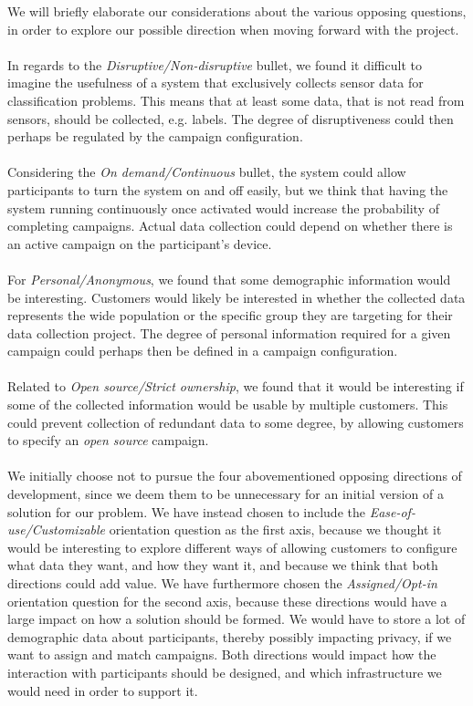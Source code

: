We will briefly elaborate our considerations about the various opposing questions, in order to explore our possible direction when moving forward with the project. 
\\\\
In regards to the \emph{Disruptive/Non-disruptive} bullet, we found it difficult to imagine the usefulness of a system that exclusively collects sensor data for classification problems. This means that at least some data, that is not read from sensors, should be collected, e.g. labels. The degree of disruptiveness could then perhaps be regulated by the campaign configuration. 
\\\\
Considering the \emph{On demand/Continuous} bullet, the system could allow participants to turn the system on and off easily, but we think that having the system running continuously once activated would increase the probability of completing campaigns. Actual data collection could depend on whether there is an active campaign on the participant's device. 
\\\\
For \emph{Personal/Anonymous}, we found that some demographic information would be interesting. Customers would likely be interested in whether the collected data represents the wide population or the specific group they are targeting for their data collection project. The degree of personal information required for a given campaign could perhaps then be defined in a campaign configuration. 
\\\\
Related to \emph{Open source/Strict ownership}, we found that it would be interesting if some of the collected information would be usable by multiple customers. This could prevent collection of redundant data to some degree, by allowing customers to specify an \emph{open source} campaign.
\\\\
We initially choose not to pursue the four abovementioned opposing directions of development, since we deem them to be unnecessary for an initial version of a solution for our problem. 
We have instead chosen to include the \emph{Ease-of-use/Customizable} orientation question as the first axis, because we thought it would be interesting to explore different ways of allowing customers to configure what data they want, and how they want it, and because we think that both directions could add value. 
We have furthermore chosen the \emph{Assigned/Opt-in} orientation question for the second axis, because these directions would have a large impact on how a solution should be formed. We would have to store a lot of demographic data about participants, thereby possibly impacting privacy, if we want to assign and match campaigns. Both directions would impact how the interaction with participants should be designed, and which infrastructure we would need in order to support it.
